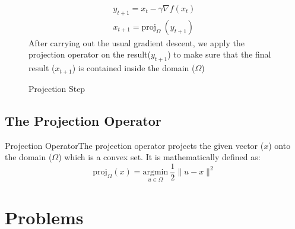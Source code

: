\documentclass[a4paper, 11pt]{article}
\newcommand{\dfn}[2]{\begin{definition}{#1}{}#2\end{definition}}
\begin{document}
\begin{figure}[h]
  \begin{minipage}[c]{7cm}
    \caption{Projection Step}
  \end{minipage}
  \begin{minipage}[c]{\textwidth-7cm}
    \begin{align*}
      y_{t+1} = x_t - \gamma \nabla f(x_t) \\
      x_{t+1} = \textrm{proj}_{\Omega} \ (y_{t+1})
    \end{align*}
    After carrying out the usual gradient descent, we apply the projection operator on the result($y_{t+1}$) to make sure that the final result ($x_{t+1}$) is contained inside the domain ($\Omega$)
   \end{minipage}
\end{figure}

\subsection{The Projection Operator}
\label{projection-operator}
\dfn{Projection Operator}{The projection operator projects the given vector ($x$) onto the domain ($\Omega$) which is a convex set. It is mathematically defined as:
\[ 
  \textrm{proj}_{\Omega}(x) = \underset{u \in \Omega}{\textrm{argmin}} \  \frac{1}{2} \lVert u - x \rVert ^2
\]
}

\newpage

\section{Problems}

\end{document}

